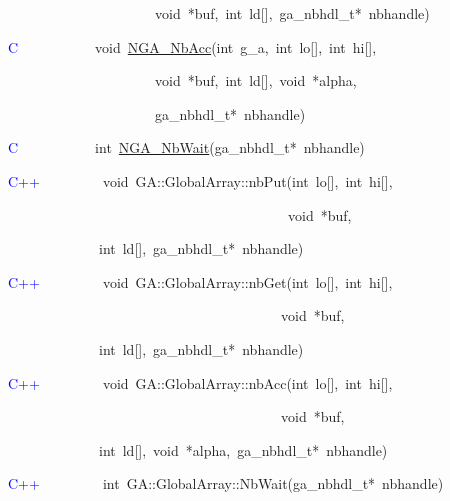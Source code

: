 ~~~~~~~~~~~~~~~~~~~~~void~{*}buf,~int~ld{[}{]},~ga\_nbhdl\_t{*}~nbhandle)~

\textcolor{blue}{C}~~~~~~~~~~~void~\href{http://www.emsl.pnl.gov/docs/global/c_nga_ops.html\#ga_nbacc}{NGA\_{}NbAcc}(int~g\_a,~int~lo{[}{]},~int~hi{[}{]},~

~~~~~~~~~~~~~~~~~~~~~void~{*}buf,~int~ld{[}{]},~void~{*}alpha,~

~~~~~~~~~~~~~~~~~~~~~ga\_nbhdl\_t{*}~nbhandle)~

\textcolor{blue}{C}~~~~~~~~~~~int~\href{http://www.emsl.pnl.gov/docs/global/c_nga_ops.html\#ga_nbwait}{NGA\_{}NbWait}(ga\_nbhdl\_t{*}~nbhandle)

\textcolor{blue}{C++}~~~~~~~~~void~GA::GlobalArray::nbPut(int~lo{[}{]},~int~hi{[}{]},~

~~~~~~~~~~~~~~~~~~~~~~~~~~~~~~~~~~~~~~~~void~{*}buf,~

~~~~~~~~~~~~~int~ld{[}{]},~ga\_nbhdl\_t{*}~nbhandle)~

\textcolor{blue}{C++}~~~~~~~~~void~GA::GlobalArray::nbGet(int~lo{[}{]},~int~hi{[}{]},~

~~~~~~~~~~~~~~~~~~~~~~~~~~~~~~~~~~~~~~~void~{*}buf,~

~~~~~~~~~~~~~int~ld{[}{]},~ga\_nbhdl\_t{*}~nbhandle)~

\textcolor{blue}{C++}~~~~~~~~~void~GA::GlobalArray::nbAcc(int~lo{[}{]},~int~hi{[}{]},~

~~~~~~~~~~~~~~~~~~~~~~~~~~~~~~~~~~~~~~~void~{*}buf,~

~~~~~~~~~~~~~int~ld{[}{]},~void~{*}alpha,~ga\_nbhdl\_t{*}~nbhandle)~

\textcolor{blue}{C++}~~~~~~~~~int~GA::GlobalArray::NbWait(ga\_nbhdl\_t{*}~nbhandle)

